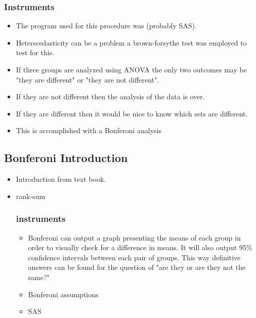\begin{itemize}
    \subsubsection{Instruments}
    \begin{itemize}
        \item The program used for this procedure was (probably SAS).
        \item Heterscedasticity can be a problem a brown-forsythe test was employed to test for this.
        \item If three groups are analyzed using ANOVA the only two outcomes may be "they are different" or "they are not different".
        \item If they are not different then the analysis of the data is over.
        \item If they are different then it would be nice to know which sets are different.
        \item This is accomplished with a Bonferoni analysis
    \end{itemize}
\end{itemize}
\subsection{Bonferoni Introduction}
\begin{itemize}
    \item Introduction from text book.
    \item rank-sum
    \subsubsection{instruments}
    \begin{itemize}
        \item Bonferoni can output a graph presenting the means of each group in order to visually check for a difference in means. It will also output 95\%
        confidence intervals between each pair of groups.  This way definitive answers can be found for the question of "are they or are they not the same?"
        \item Bonferoni assumptions
        \item SAS
    \end{itemize}
\end{itemize}
